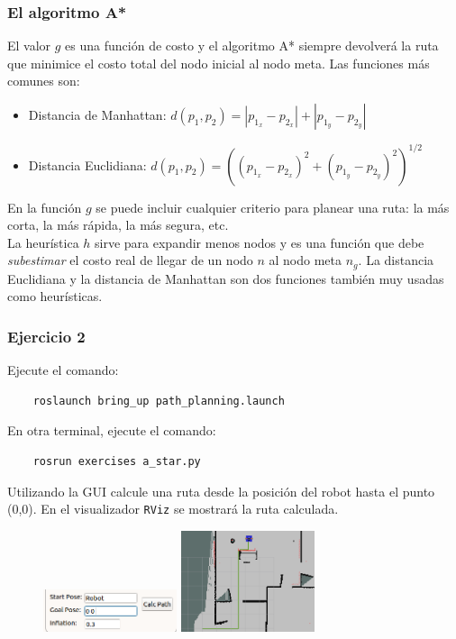 \begin{frame}\frametitle{El algoritmo A*}
  El valor $g$ es una función de costo y el algoritmo A* siempre devolverá la ruta que minimice el costo total del nodo inicial al nodo meta. Las funciones más comunes son:
  \begin{itemize}
  \item Distancia de Manhattan: $d(p_1, p_2) = |p_{1_x} - p_{2_x}| + |p_{1_y} - p_{2_y}|$
  \item Distancia Euclidiana: $d(p_1, p_2) = \left( (p_{1_x} - p_{2_x})^2 + (p_{1_y} - p_{2_y})^2 \right)^{1/2}$
  \end{itemize}
  En la función $g$ se puede incluir cualquier criterio para planear una ruta: la más corta, la más rápida, la más segura, etc.\\
  La heurística $h$ sirve para expandir menos nodos y es una función que debe \textit{subestimar} el costo real de llegar de un nodo $n$ al nodo meta $n_g$. La distancia Euclidiana y la distancia de Manhattan son dos funciones también muy usadas como heurísticas. 
\end{frame}

\begin{frame}[containsverbatim]\frametitle{Ejercicio 2}
  Ejecute el comando:
  \begin{lstlisting}
    roslaunch bring_up path_planning.launch
  \end{lstlisting}
  En otra terminal, ejecute el comando:
  \begin{lstlisting}
    rosrun exercises a_star.py
  \end{lstlisting}
  Utilizando la GUI calcule una ruta desde la posición del robot hasta el punto (0,0). En el visualizador \texttt{RViz} se mostrará la ruta calculada.\\
  \begin{figure}
    \centering
    \includegraphics[width=0.35\textwidth]{Figures/Exercise1Gui.png}
    \includegraphics[width=0.35\textwidth]{Figures/Exercise1Rviz.png}
  \end{figure}
\end{frame}

